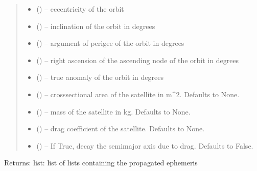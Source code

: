 \documentclass[letterpaper,10pt,english]{sphinxmanual}
\begin{document}
\begin{fulllineitems}
\begin{quote}
\begin{description}
\begin{itemize}
\item {} 
\sphinxAtStartPar
{} () – eccentricity of the orbit

\item {} 
\sphinxAtStartPar
{} () – inclination of the orbit in degrees

\item {} 
\sphinxAtStartPar
{} () – argument of perigee of the orbit in degrees

\item {} 
\sphinxAtStartPar
{} () – right ascension of the ascending node of the orbit in degrees

\item {} 
\sphinxAtStartPar
{} () – true anomaly of the orbit in degrees

\item {} 
\sphinxAtStartPar
{} (\sphinxstyleliteralemphasis{\sphinxupquote{, }}) – cross\sphinxhyphen{}sectional area of the satellite in m\textasciicircum{}2. Defaults to None.

\item {} 
\sphinxAtStartPar
{} (\sphinxstyleliteralemphasis{\sphinxupquote{, }}) – mass of the satellite in kg. Defaults to None.

\item {} 
\sphinxAtStartPar
{} (\sphinxstyleliteralemphasis{\sphinxupquote{, }}) – drag coefficient of the satellite. Defaults to None.

\item {} 
\sphinxAtStartPar
{} (\sphinxstyleliteralemphasis{\sphinxupquote{, }}) – If True, decay the semi\sphinxhyphen{}major axis due to drag. Defaults to False.

\end{itemize}

\end{description}\end{quote}

\sphinxAtStartPar
Returns:
list: list of lists containing the propagated ephemeris

\end{fulllineitems}
\end{document}
